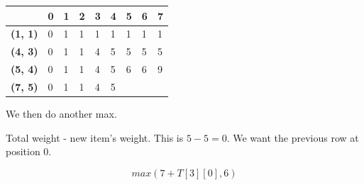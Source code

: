 \documentclass{article}
\begin{document}
\begin{center}
\begin{tabular}{|l|l|l|l|l|l|l|l|l|}
\hline
                & \textbf{0} & \textbf{1} & \textbf{2} & \textbf{3} & \textbf{4} & \textbf{5} & \textbf{6} & \textbf{7} \\ \hline
\textbf{(1, 1)} & 0          &1            &1            &1            &1            &1            &1            &1            \\ \hline
\textbf{(4, 3)} & 0          &1            &1            &4            &5            &5            &  5          &  5          \\ \hline
\textbf{(5, 4)} & 0          &1            &1            &4            &5            &6            &6            & 9           \\ \hline
\textbf{(7, 5)} & 0          & 1           & 1           &   4         &   5         &            &            &            \\ \hline
\end{tabular}
\end{center}
We then do another max.

Total weight - new item's weight. This is $5 - 5 = 0$. We want the previous row at position 0.

$$max(7 + T[3][0], 6)$$
\end{document}
